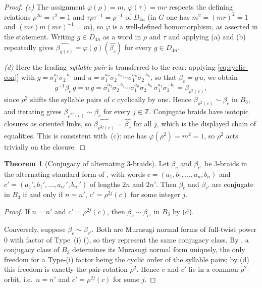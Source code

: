 \documentclass[11pt]{article}
\theoremstyle{definition}
\newtheorem{theorem}{Theorem}[section]
\begin{document}
\begin{proof}
\smallskip
\noindent\emph{\textup{(c)}} The assignment $\varphi(\rho)=m$, $\varphi(\tau)=mr$
respects the defining relations $\rho^{2n}=\tau^{2}=1$ and $\tau\rho\tau^{-1}=\rho^{-1}$
of $D_{4n}$ (in $G$ one has $m^{2}=(mr)^{2}=1$ and $(mr)m(mr)^{-1}=m$), so $\varphi$ is a
well-defined homomorphism, as asserted in the statement. Writing $g\in D_{4n}$ as a word
in $\rho$ and $\tau$ and applying (a) and (b) repeatedly gives
$\widehat{\beta_{g(c)}}=\varphi(g)(\widehat{\beta_c})$ for every $g\in D_{4n}$.

\smallskip
\noindent\emph{\textup{(d)}} Here the leading \emph{syllable pair} is transferred to the
rear: applying \eqref{eq:cyclic-conj} with $g=\sigma_{1}^{a_1}\sigma_{2}^{-b_1}$ and
$u=\sigma_{1}^{a_2}\sigma_{2}^{-b_2}\cdots\sigma_{1}^{a_n}\sigma_{2}^{-b_n}$, so that
$\beta_c=g\,u$, we obtain
\[
g^{-1}\beta_c\,g
=u\,g
=\sigma_{1}^{a_2}\sigma_{2}^{-b_2}\cdots\sigma_{1}^{a_n}\sigma_{2}^{-b_n}\,
 \sigma_{1}^{a_1}\sigma_{2}^{-b_1}
=\beta_{\rho^{2}(c)},
\]
since $\rho^{2}$ shifts the syllable pairs of $c$ cyclically by one. Hence
$\beta_{\rho^{2}(c)}\sim\beta_c$ in $B_3$, and iterating gives
$\beta_{\rho^{2j}(c)}\sim\beta_c$ for every $j\in\mathbb{Z}$. Conjugate braids have
isotopic closures as oriented links, so
$\widehat{\beta_{\rho^{2j}(c)}}=\widehat{\beta_c}$ for all $j$, which is the displayed
chain of equalities. This is consistent with~(c): one has $\varphi(\rho^{2})=m^{2}=1$, so
$\rho^{2}$ acts trivially on the closure.
\end{proof}

\begin{theorem}[Conjugacy of alternating $3$-braids]\label{thm:conjugacy_3braids}
Let $\beta_c$ and $\beta_{c'}$ be $3$-braids in the alternating standard form of
, with words
$c=(a_1,b_1,\dots,a_n,b_n)$ and $c'=(a_1',b_1',\dots,a_{n'}',b_{n'}')$
of lengths $2n$ and $2n'$. Then $\beta_c$ and $\beta_{c'}$ are conjugate in $B_3$ if and
only if $n=n'$, $c'=\rho^{2j}(c)$ for some integer $j$.
\end{theorem}

\begin{proof}
If $n=n'$ and $c'=\rho^{2j}(c)$, then $\beta_c\sim\beta_{c'}$ in $B_3$ by
(d).

Conversely, suppose $\beta_c\sim\beta_{c'}$. Both are Murasugi normal forms of
full-twist power $0$ with factor of Type~(i) (), so
they represent the same conjugacy class. By
, a conjugacy class of $B_3$ determines its
Murasugi normal form uniquely, the only freedom for a Type-(i) factor being the
cyclic order of the syllable pairs; by (d) this freedom is
exactly the pair-rotation $\rho^{2}$. Hence $c$ and $c'$ lie in a common
$\rho^{2}$-orbit, i.e.\ $n=n'$ and $c'=\rho^{2j}(c)$ for some $j$.
\end{proof}
\end{document}
